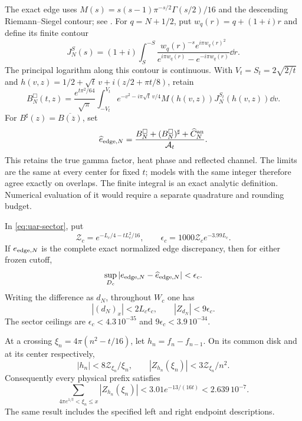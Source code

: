 The exact edge uses
$M(s)=s(s-1)\pi^{-s/2}\Gamma(s/2)/16$ and the descending
Riemann--Siegel contour; see \cite[\S4]{Polymath}.
For $q=N+1/2$, put $w_q(r)=q+(1+i)r$ and define its finite contour
\[
 J_N^S(s)=(1+i)\int_S^{-S}
 \frac{w_q(r)^{-s}e^{i\pi w_q(r)^2}}
 {e^{i\pi w_q(r)}-e^{-i\pi w_q(r)}}\dd r .
\]
The principal logarithm along this contour is continuous. With
$V_t=S_t=2\sqrt{2/t}$ and
$h(v,z)=1/2+\sqrt t\,v+i(z/2+\pi t/8)$, retain
\begin{equation}\label{eq:compact-edge-model}
 B_N^\Box(t,z)=\frac{e^{t\pi^2/64}}{\sqrt\pi}
 \int_{-V_t}^{V_t}e^{-v^2-i\pi\sqrt t\,v/4}
 M(h(v,z))J_N^{S_t}(h(v,z))\dd v .
\end{equation}
For $B^\sharp(z)=\overline{B(\overline z)}$, set
\[
 \widehat e_{{\rm edge},N}
 =\frac{B_N^\Box+(B_N^\Box)^\sharp+\widehat C_N^{\rm an}}
 {\mathcal A_t}.
\]
This retains the true gamma factor, heat phase and reflected channel.
The limits are the same at every center for fixed $t$; models with the
same integer therefore agree exactly on overlaps. The finite integral
is an exact analytic definition. Numerical evaluation of it would
require a separate quadrature and rounding budget.

\begin{theorem}
\label{thm:coherent-edge}
In \eqref{eq:uar-sector}, put
\[
 \mathcal Z_c=e^{-L_c/4-tL_c^2/16},\qquad
 \epsilon_c=1000\mathcal Z_c e^{-3.99L_c}.
\]
If $e_{{\rm edge},N}$ is the complete exact normalized edge discrepancy,
then for either frozen cutoff,
\[
 \sup_{D_c}|e_{{\rm edge},N}-\widehat e_{{\rm edge},N}|
 <\epsilon_c .
\]
Writing the difference as $d_N$, throughout $W_c$ one has
\[
 |(d_N)_x|<2L_c\epsilon_c,\qquad |Z_{d_N}|<9\epsilon_c.
\]
The sector ceilings are $\epsilon_c<4.3\,10^{-35}$ and
$9\epsilon_c<3.9\,10^{-34}$.

At a crossing $\xi_n=4\pi(n^2-t/16)$, let $h_n=f_n-f_{n-1}$.
On its common disk and at its center respectively,
\[
 |h_n|<8\mathcal Z_{\xi_n}/\xi_n,\qquad
 |Z_{h_n}(\xi_n)|<3\mathcal Z_{\xi_n}/n^2.
\]
Consequently every physical prefix satisfies
\begin{equation}\label{eq:uar-transition-prefix}
 \sum_{4\pi e^{1/t}<\xi_n\le x}|Z_{h_n}(\xi_n)|
 <3.01e^{-13/(16t)}<2.639\,10^{-7}.
\end{equation}
The same result includes the specified left and right endpoint descriptions.
\end{theorem}

